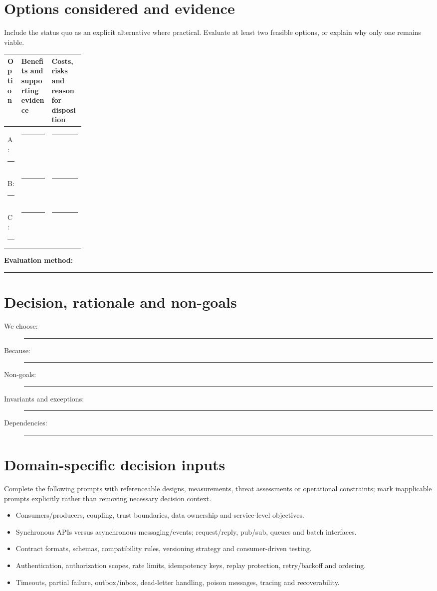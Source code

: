 \documentclass[11pt,letterpaper]{article}
\newcommand{\BlankResponse}{\rule[-0.4em]{0pt}{2em}\rule{0.65\linewidth}{0.4pt}}
\begin{document}
\section{Options considered and evidence}
Include the status quo as an explicit alternative where practical. Evaluate
at least two feasible options, or explain why only one remains viable.
\par\noindent\begin{tabularx}{\linewidth}{@{}>{\raggedright\arraybackslash}p{0.18\linewidth}>{\raggedright\arraybackslash}X >{\raggedright\arraybackslash}X@{}}
\toprule
\textbf{Option} & \textbf{Benefits and supporting evidence} & \textbf{Costs, risks and reason for disposition}\\
\midrule
A: \BlankResponse & \BlankResponse & \BlankResponse\\
B: \BlankResponse & \BlankResponse & \BlankResponse\\
C: \BlankResponse & \BlankResponse & \BlankResponse\\
\bottomrule
\end{tabularx}\par

\noindent\textbf{Evaluation method:} \BlankResponse

\section{Decision, rationale and non-goals}
\begin{description}
\item[We choose:] \BlankResponse
\item[Because:] \BlankResponse
\item[Non-goals:] \BlankResponse
\item[Invariants and exceptions:] \BlankResponse
\item[Dependencies:] \BlankResponse
\end{description}

\section{Domain-specific decision inputs}
Complete the following prompts with referenceable designs, measurements,
threat assessments or operational constraints; mark inapplicable prompts
explicitly rather than removing necessary decision context.
\begin{itemize}
\item Consumers/producers, coupling, trust boundaries, data ownership and service-level objectives.
\item Synchronous APIs versus asynchronous messaging/events; request/reply, pub/sub, queues and batch interfaces.
\item Contract formats, schemas, compatibility rules, versioning strategy and consumer-driven testing.
\item Authentication, authorization scopes, rate limits, idempotency keys, replay protection, retry/backoff and ordering.
\item Timeouts, partial failure, outbox/inbox, dead-letter handling, poison messages, tracing and recoverability.
\end{itemize}
\end{document}
